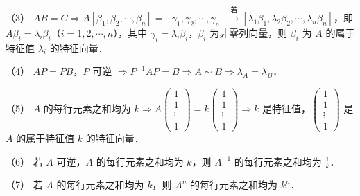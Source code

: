 \begin{fcard}{（3）}
$AB=C\Rightarrow A[\beta_1,\beta_2,\cdots,\beta_n]=[\gamma_1,\gamma_2,\cdots,\gamma_n]\xrightarrow{\text{若}}[\lambda_1\beta_1,\lambda_2\beta_2,\cdots,\lambda_n\beta_n]$，即 $A\beta_i=\lambda_i\beta_i$（$i=1,2,\cdots,n$），其中 $\gamma_i=\lambda_i\beta_i$，$\beta_i$ 为非零列向量，则 $\beta_i$ 为 $A$ 的属于特征值 $\lambda_i$ 的特征向量．
\end{fcard}

\begin{fcard}{（4）}
$AP=PB$，$P$ 可逆 $\Rightarrow P^{-1}AP=B\Rightarrow A\sim B\Rightarrow \lambda_A=\lambda_B$．
\end{fcard}

\begin{fcard}{（5）}
$A$ 的每行元素之和均为 $k\Rightarrow A\begin{pmatrix}1\\1\\\vdots\\1\end{pmatrix}=k\begin{pmatrix}1\\1\\\vdots\\1\end{pmatrix}\Rightarrow k$ 是特征值，$\begin{pmatrix}1\\1\\\vdots\\1\end{pmatrix}$ 是 $A$ 的属于特征值 $k$ 的特征向量．
\end{fcard}

\begin{fcard}{（6）}
若 $A$ 可逆，$A$ 的每行元素之和均为 $k$，则 $A^{-1}$ 的每行元素之和均为 $\frac{1}{k}$．
\end{fcard}

\begin{fcard}{（7）}
若 $A$ 的每行元素之和均为 $k$，则 $A^n$ 的每行元素之和均为 $k^n$．
\end{fcard}

